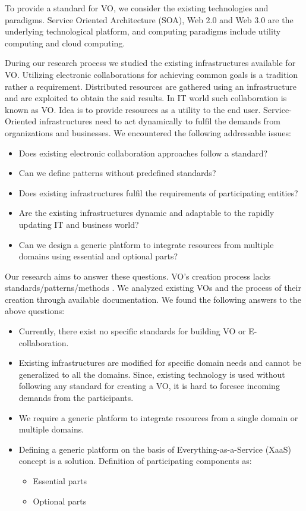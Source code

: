 \documentclass[]{article}
\begin{document}
To provide a standard for VO, we consider the existing technologies and paradigms. Service Oriented Architecture (SOA), Web 2.0 and Web 3.0 are the underlying technological platform, and computing paradigms include utility computing and cloud computing.

During our research process we studied the existing infrastructures available for VO.
Utilizing electronic collaborations for achieving common goals is a tradition rather a requirement. Distributed resources are gathered using an infrastructure and are exploited to obtain the said results. In IT world such collaboration is known as VO. Idea is to provide resources as a utility to the end user. Service-Oriented infrastructures need to act dynamically to fulfil the demands from organizations and businesses. We encountered the following addressable issues:


\begin{itemize}
\item Does existing electronic collaboration approaches follow a standard?
\item Can we define patterns without predefined standards?
\item Does existing infrastructures fulfil the requirements of participating entities?
\item Are the existing infrastructures dynamic and adaptable to the rapidly updating IT and business world?
\item Can we design a generic platform to integrate resources from multiple domains using essential and optional parts?
\end{itemize}
	
Our research aims to answer these questions. VO's creation process lacks standards/patterns/methods \cite{Kesselman2008}. We analyzed existing VOs and the process of their creation through available documentation. We found the following answers to the above questions:

\begin{itemize}
\item Currently, there exist no specific standards for building VO or E-collaboration.
\item Existing infrastructures are modified for specific domain needs and cannot be generalized to all the domains. Since, existing technology is used without following any standard for creating a VO, it is hard to foresee incoming demands from the participants.
\item We require a generic platform to integrate resources from a single domain or multiple domains.
\item Defining a generic platform on the basis of Everything-as-a-Service (XaaS)\cite{Plummer2008cloud} concept is a solution.
Definition of participating components as:
	\begin{itemize}
		\item	Essential parts
		\item	Optional parts
	\end{itemize}
\end{itemize}
\end{document}
